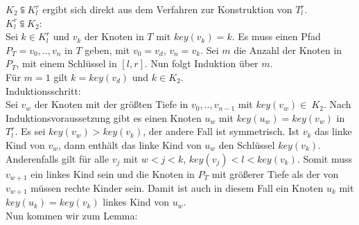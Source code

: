 \documentclass[a4paper,12pt]{article}
\begin{document}
\noindent $K_2 \subseteqq  K^r_l$ ergibt sich direkt aus dem Verfahren zur Konstruktion von $T^r_l$.\\

\noindent $ K^r_l \subseteqq K_2$:\\
Sei $k \in K^r_l$ und $v_k$ der Knoten in $T$ mit $\mathit{key}(v_k) = k$. Es muss einen Pfad $P_T = v_0,..,v_n$ in $T$ geben, mit $v_0 = v_d$, $v_n = v_k$. Sei $m$ die Anzahl der Knoten in $P_T$, mit einem Schlüssel in  $\left[l,r\right]$. Nun folgt Induktion über $m$.\\
Für $m = 1$ gilt $k = \mathit{key}\left(v_d\right)$  und $k \in K_2$. \\
Induktionsschritt:\\
Sei $v_w$ der Knoten mit der größten Tiefe in $ v_0,..,v_{n-1}$ mit $\mathit{key}(v_w) \in~K_2$. Nach Induktionsvoraussetzung gibt es einen Knoten $u_w$ mit $\mathit{key}(u_w) = \mathit{key}(v_w)$ in $T^r_l$.  Es sei $\mathit{key}(v_w) > \mathit{key}(v_k)$, der andere Fall ist symmetrisch. Ist $v_k$ das linke Kind von $v_w$, dann enthält das linke Kind von $u_w$ den Schlüssel $\mathit{key}(v_k)$. Anderenfalls gilt für alle $v_j$ mit $w < j < k$, $\mathit{key}(v_j) < l < \mathit{key}(v_k)$. Somit muss $v_{w+1}$ ein linkes Kind sein und die Knoten in $P_T$ mit größerer Tiefe als der von $v_{w+1}$ müssen rechte Kinder sein. Damit ist auch in diesem Fall ein Knoten $u_k$ mit $\mathit{key}(u_k) = \mathit{key}(v_k)$ linkes Kind von $u_w$.  \\

\noindent Nun kommen wir zum Lemma:\\
\end{document}
